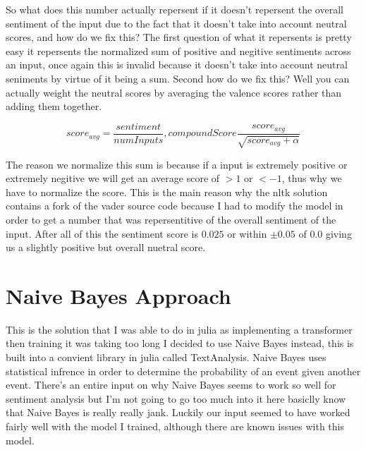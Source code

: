 \documentclass[12pt]{article}
\begin{document}
So what does this number actually repersent
if it doesn't repersent the overall sentiment of the input due to the fact
that it doesn't take into account
neutral scores, and how do we fix this? The first question of what it repersents
is pretty easy it repersents the normalized sum of positive and negitive sentiments 
across an input, once again this is invalid because it doesn't take into account
neutral seniments by virtue of it being a sum. Second how do we fix this? Well
you can actually weight the neutral scores by averaging the valence scores rather
than adding them together.

$$
score_{avg} = \frac{sentiment}{numInputs}, 
compoundScore\frac{score_{avg}}{\sqrt{score_{avg} + \alpha}}
$$

The reason we normalize this sum is because if a input is extremely positive 
or extremely negitive we will get an average score of $>1$ or $<-1$, thus why we
have to normalize the score. This is the main reason why the nltk solution
contains a fork of the vader source code because I had to modify the model in order
to get a number that was repersentitive of the overall sentiment of the input.
After all of this the sentiment score is $0.025$ or within $\pm0.05$ of $0.0$ giving
us a slightly positive but overall nuetral score.

\newpage
\section{Naive Bayes Approach}
This is the solution that I was able to do in julia as implementing a transformer then training it was taking too long I decided to use Naive Bayes instead, this is built into a convient library in julia called TextAnalysis. Naive Bayes uses statistical infrence  in order to determine the probability of an event given another event. There's an entire input on why Naive Bayes seems to work so well for sentiment analysis but I'm not going to go too much into it here basiclly know that Naive Bayes is really  really jank. Luckily our input seemed to have worked fairly well with the model I trained, although there are known issues with this model.
\end{document}
